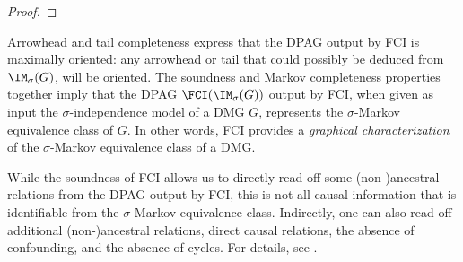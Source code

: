 \begin{proof}

\end{proof}


Arrowhead and tail completeness express that the DPAG output by FCI is maximally oriented: any arrowhead or tail that could possibly be deduced from $\IM_\sigma(G)$, will be oriented.
The soundness and Markov completeness properties together imply that the DPAG $\FCI(\IM_\sigma(G))$ output by FCI, when given as input the $\sigma$-independence model of a DMG $G$, represents the $\sigma$-Markov equivalence class of $G$.
In other words, FCI provides a \emph{graphical characterization} of the $\sigma$-Markov equivalence class of a DMG.

While the soundness of FCI allows us to directly read off some (non-)ancestral relations from the DPAG output by FCI, 
this is not all causal information that is identifiable from the $\sigma$-Markov equivalence class. 
Indirectly, one can also read off additional (non-)ancestral relations, direct causal relations, the absence of confounding, and the absence of cycles. 
For details, see \cite{MooijClaassen_UAI_20}.

